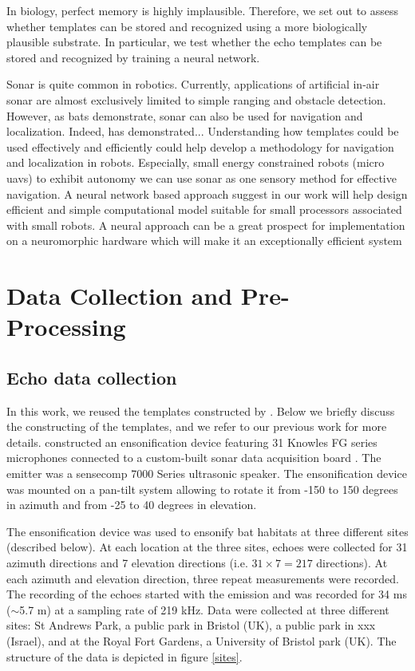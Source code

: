 \documentclass[11pt]{report}
\begin{document}
In biology, perfect memory is highly implausible. Therefore, we set out to assess whether templates can be stored and recognized using a more biologically plausible substrate. In particular, we test whether the echo templates can be stored and recognized by training a neural network.

Sonar is quite common in robotics. Currently, applications of artificial in-air sonar are almost exclusively limited to simple ranging and obstacle detection. However, as bats demonstrate, sonar can also be used for navigation and localization. Indeed, \citet{steckel2013batslam} has demonstrated... Understanding how templates could be used effectively and efficiently could help develop a methodology for navigation and localization in robots. Especially, small energy constrained robots (micro uavs) to exhibit autonomy we can use sonar as one sensory method for effective navigation. A neural network based approach suggest in our work will help design efficient and simple computational model suitable for small processors associated with small robots. A neural approach can be a great prospect for implementation on a neuromorphic hardware which will make it an exceptionally efficient system

\chapter{Data Collection and Pre-Processing}

\section{Echo data collection}

In this work, we reused the templates constructed by \citet{Vanderelst2016}. Below we briefly discuss the constructing of the templates, and we refer to our previous work for more details. \citet{Vanderelst2016} constructed an ensonification device featuring 31 Knowles FG series microphones connected to a custom-built sonar data acquisition board \citet{steckel2013batslam}. The emitter was a sensecomp 7000 Series ultrasonic speaker. The ensonification device was mounted on a pan-tilt system allowing to rotate it from -150 to 150 degrees in azimuth and from -25 to 40 degrees in elevation. 

The ensonification device was used to ensonify bat habitats at three different sites (described below). At each location at the three sites, echoes were collected for 31 azimuth directions and 7 elevation directions (i.e. $31 \times 7 = 217$ directions). At each azimuth and elevation direction, three repeat measurements were recorded. The recording of the echoes started with the emission and was recorded for 34 ms ($\sim$5.7 m) at a sampling rate of 219 kHz. Data were collected at three different sites: St Andrews Park, a public park in Bristol (UK), a public park in xxx (Israel), and at the Royal Fort Gardens, a University of Bristol park (UK). The structure of the data is depicted in figure \ref{sites}. 
\end{document}
